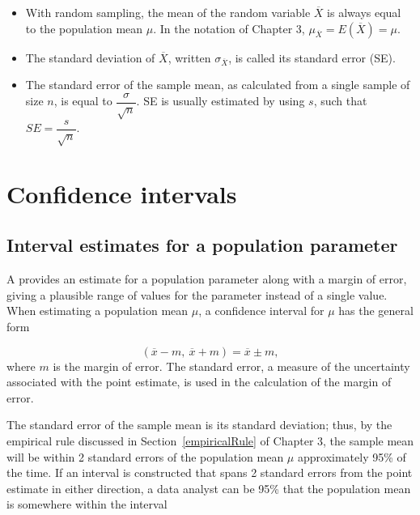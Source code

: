 \begin{spacing}{1.5}
\begin{itemize}
	\item With random sampling, the mean of the random variable $\overline{X}$ is always equal to the population mean $\mu$.  In the notation of Chapter 3, $\mu_{\overline{X}} = E(\overline{X}) = \mu$.
	
	\item  The standard deviation of $\overline{X}$, written $\sigma_{\overline{X}}$, is called its standard error (SE). 
	
	\item The standard error of the sample mean, as calculated from a single sample of size $n$, is equal to $\dfrac{\sigma}{\sqrt{n}}$. SE is usually estimated by using $s$, such that $SE = \dfrac{s}{\sqrt{n}}$.
	
\end{itemize}


\section[Confidence intervals]{Confidence intervals} %
\label{confidenceIntervals}
\subsection{Interval estimates for a population parameter}

A  provides an estimate for a population parameter along with a margin of error, giving a plausible range of values for the parameter instead of a single value. When estimating a population mean $\mu$, a confidence interval for $\mu$ has the general form

\[(\overline{x} -m, \ \overline{x} + m) = \overline{x} \pm m, \]
where $m$ is the margin of error. The standard error, a measure of the uncertainty associated with the point estimate, is used in the calculation of the margin of error.


The standard error of the sample mean is its standard deviation; thus, by the empirical rule discussed in Section~\ref{empiricalRule} of Chapter 3, the sample mean will be within 2 standard errors of the population mean $\mu$ approximately 95\% of the time. If an interval is constructed that spans 2 standard errors from the point estimate in either direction, a data analyst can be 95\%  that the population mean is somewhere within the interval


\end{spacing}
